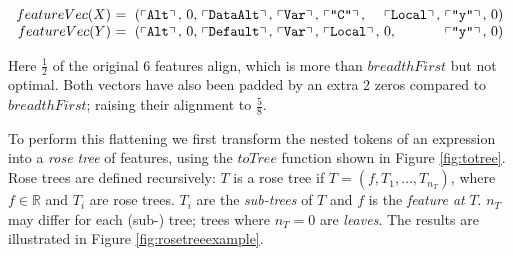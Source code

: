 \begin{small}
  \begin{equation*}\label{eq:flattened}
    \begin{array}{r@{}l@{}l@{}l@{}l@{}l@{}l@{}l@{}l@{}l}
      featureVec(X)\ &=\ (\feature{\CAlt},\ &0,\ &\feature{\CDataAlt},\ &\feature{\CVar},\ &\feature{\id{C}},\  &\feature{\CLocal},\ &\feature{\id{y}},\ &0 &) \\
      featureVec(Y)\ &=\ (\feature{\CAlt},\ &0,\ &\feature{\CDefault},\ &\feature{\CVar},\ &\feature{\CLocal},\ &0,\                 &\feature{\id{y}},\ &0 &)
    \end{array}
  \end{equation*}
\end{small}

Here $\frac{1}{2}$ of the original 6 features align, which is more than $breadthFirst$ but not optimal. Both vectors have also been padded by an extra 2 zeros compared to $breadthFirst$; raising their alignment to $\frac{5}{8}$.

To perform this flattening we first transform the nested tokens of an expression into a \emph{rose tree} of features, using the $toTree$ function shown in Figure \ref{fig:totree}. \iffalse TODO: Make a formal definition in an environment, i.e. not inline? \fi Rose trees are defined recursively: $T$ is a rose tree if $T = (f, T_1, \dots, T_{n_T})$, where $f \in \mathbb{R}$ and $T_i$ are rose trees. $T_i$ are the \emph{sub-trees} of $T$ and $f$ is the \emph{feature at} $T$. $n_T$ may differ for each (sub-) tree; trees where $n_T = 0$ are \emph{leaves}. The results are illustrated in Figure \ref{fig:rosetreeexample}.

